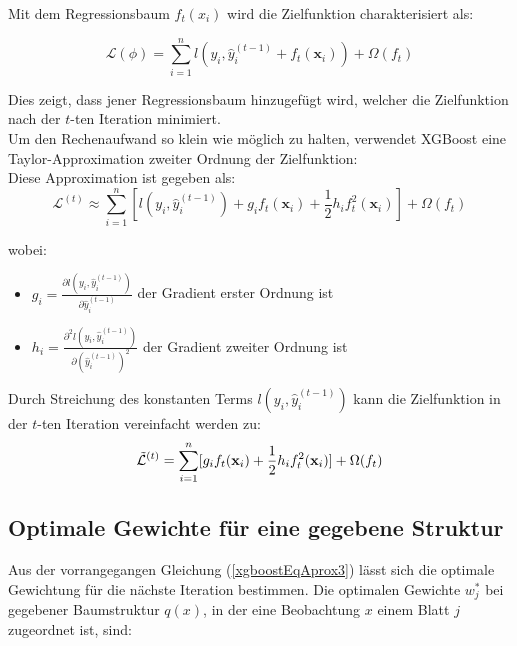 \documentclass[12pt,titlepage,oneside]{book}
\begin{document}
Mit dem Regressionsbaum $f_t(x_i)$ wird die Zielfunktion charakterisiert als:

\begin{equation}
\mathcal{L}(\phi) = \sum_{i=1}^n l(y_i, \hat{y}_i^{(t-1)} + f_t(\mathbf{x}_i)) + \Omega(f_t)
\end{equation}

Dies zeigt, dass jener Regressionsbaum hinzugefügt wird, welcher die Zielfunktion nach der $t$-ten Iteration minimiert.\\


Um den Rechenaufwand so klein wie möglich zu halten, verwendet XGBoost eine Taylor-Approximation zweiter Ordnung der Zielfunktion:\\

Diese Approximation ist gegeben als:
\begin{equation}
\mathcal{L}^{(t)} \approx \sum_{i=1}^n [l(y_i, \hat{y}_i^{(t-1)}) + g_i f_t(\mathbf{x}_i) + \frac{1}{2}h_i f_t^2(\mathbf{x}_i)] + \Omega(f_t)
\end{equation}

wobei:
\begin{itemize}
    \item $g_i = \frac{\partial l(y_i, \hat{y}_i^{(t-1)})}{\partial \hat{y}_i^{(t-1)}}$ der Gradient erster Ordnung ist
    \item $h_i = \frac{\partial^2 l(y_i, \hat{y}_i^{(t-1)})}{\partial (\hat{y}_i^{(t-1)})^2}$ der Gradient zweiter Ordnung ist
\end{itemize}

Durch Streichung des konstanten Terms $l(y_i, \hat{y}_i^{(t-1)})$ kann die Zielfunktion in der $t$-ten Iteration vereinfacht werden zu:
\begin{equation} \label{xgboostEqAprox3}
\Tilde{\mathcal{L}}^{(t)} = \sum_{i=1}^n [g_i f_t(\mathbf{x}_i) + \frac{1}{2}h_i f_t^2(\mathbf{x}_i)] + \Omega(f_t)
\end{equation}


\subsection{Optimale Gewichte für eine gegebene Struktur}

Aus der vorrangegangen Gleichung (\ref{xgboostEqAprox3}) lässt sich die optimale Gewichtung für die nächste Iteration bestimmen. Die optimalen Gewichte $w_j^*$ bei gegebener Baumstruktur $q(x)$, in der eine Beobachtung $x$ einem Blatt $j$ zugeordnet ist, sind:
\end{document}
